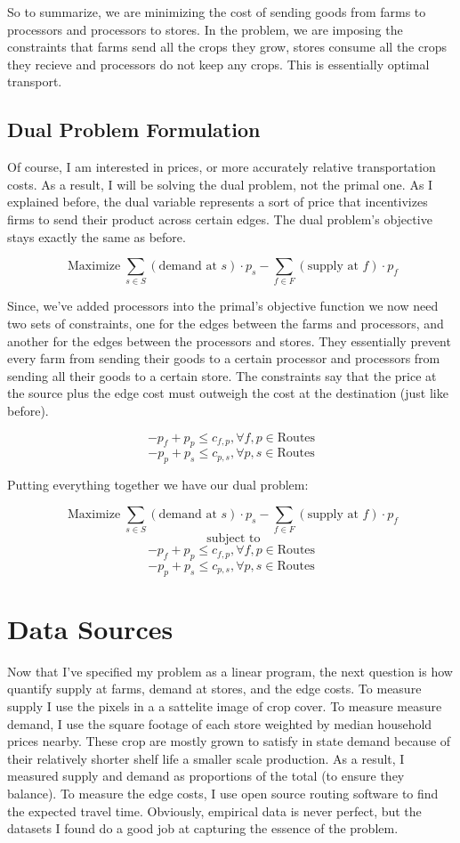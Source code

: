 \documentclass{report}
\begin{document}
So to summarize, we are minimizing the cost of sending goods from farms to processors and processors to stores. In the problem, we are imposing the constraints that farms send all the crops they grow, stores consume all the crops they recieve and processors do not keep any crops. This is essentially optimal transport.

\subsection{Dual Problem Formulation}

Of course, I am interested in prices, or more accurately relative transportation costs. As a result, I will be solving the dual problem, not the primal one. As I explained before, the dual variable represents a sort of price that incentivizes firms to send their product across certain edges. The dual problem's objective stays exactly the same as before.

$$\operatorname{Maximize} \sum_{s \in S}  (\text{demand at } s) \cdot p_{s} -   \sum_{f \in F}  (\text{supply at } f) \cdot p_{f} $$

Since, we've added processors into the primal's objective function we now need two sets of constraints, one for the edges between the farms and processors, and another for the edges between the processors and stores. They essentially prevent every farm from sending their goods to a certain processor and processors from sending all their goods to a certain store. The constraints say that  the price at the source plus the edge cost must outweigh the cost at the destination (just like before).

$$ -p_f + p_p \leq c_{f,p}, \forall f,p\in \textrm{Routes}$$
$$ -p_p + p_s \leq c_{p,s}, \forall p,s\in \textrm{Routes}$$

Putting everything together we have our dual problem:

$$\operatorname{Maximize} \sum_{s \in S}  (\text{demand at } s) \cdot p_{s} -   \sum_{f \in F}  (\text{supply at } f) \cdot p_{f} $$
$$ \text{ subject to}$$
$$ -p_f + p_p \leq c_{f,p}, \forall f,p\in \textrm{Routes}$$
$$ -p_p + p_s \leq c_{p,s}, \forall p,s\in \textrm{Routes}$$

\section{Data Sources}

Now that I've specified my problem as a linear program, the next question is how quantify supply at farms, demand at stores, and the edge costs. To measure supply I use the pixels in a a sattelite image of crop cover.  To measure measure demand, I use the square footage of each store weighted by median household prices nearby. These crop are mostly grown to satisfy in state demand because of their relatively shorter shelf life a smaller scale production. As a result, I measured supply and demand as proportions of the total (to ensure they balance). To measure the edge costs, I use open source routing software to find the expected travel time. Obviously, empirical data is never perfect, but the datasets I found do a good job at capturing the essence of the problem.
\end{document}
